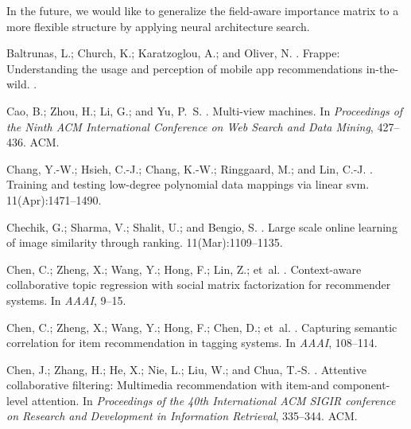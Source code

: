 \documentclass[letterpaper]{article} \usepackage{aaai19}  \usepackage{times}  \usepackage{helvet}  \usepackage{courier}  \usepackage{url}  \usepackage{graphicx}  \frenchspacing  \setlength{\pdfpagewidth}{8.5in}  \setlength{\pdfpageheight}{11in}  \usepackage{mathtools}
\begin{document}
In the future, we would like to generalize the field-aware importance matrix to a more flexible structure by applying neural architecture search\cite{liu2017progressive}.

\begin{thebibliography}{}

Baltrunas, L.; Church, K.; Karatzoglou, A.; and Oliver, N.
.
\newblock Frappe: Understanding the usage and perception of mobile app
  recommendations in-the-wild.
.

Cao, B.; Zhou, H.; Li, G.; and Yu, P.~S.
.
\newblock Multi-view machines.
\newblock In {\em Proceedings of the Ninth ACM International Conference on Web
  Search and Data Mining},  427--436.
\newblock ACM.

Chang, Y.-W.; Hsieh, C.-J.; Chang, K.-W.; Ringgaard, M.; and Lin, C.-J.
.
\newblock Training and testing low-degree polynomial data mappings via linear
  svm.
 11(Apr):1471--1490.

Chechik, G.; Sharma, V.; Shalit, U.; and Bengio, S.
.
\newblock Large scale online learning of image similarity through ranking.
 11(Mar):1109--1135.

Chen, C.; Zheng, X.; Wang, Y.; Hong, F.; Lin, Z.; et~al.
.
\newblock Context-aware collaborative topic regression with social matrix
  factorization for recommender systems.
\newblock In {\em AAAI},  9--15.

Chen, C.; Zheng, X.; Wang, Y.; Hong, F.; Chen, D.; et~al.
.
\newblock Capturing semantic correlation for item recommendation in tagging
  systems.
\newblock In {\em AAAI},  108--114.

Chen, J.; Zhang, H.; He, X.; Nie, L.; Liu, W.; and Chua, T.-S.
.
\newblock Attentive collaborative filtering: Multimedia recommendation with
  item-and component-level attention.
\newblock In {\em Proceedings of the 40th International ACM SIGIR conference on
  Research and Development in Information Retrieval},  335--344.
\newblock ACM.


\end{thebibliography}
\end{document}
